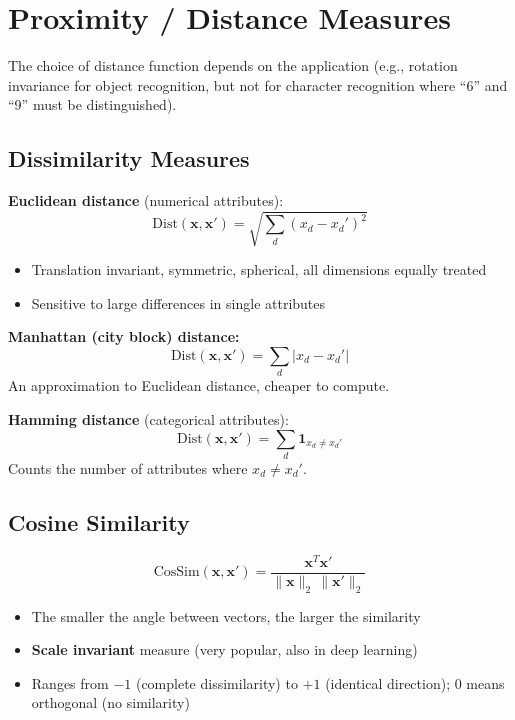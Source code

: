 \documentclass[11pt,a4paper]{article}
\theoremstyle{definition}
\theoremstyle{plain}
\theoremstyle{remark}
\begin{document}

\section{Proximity / Distance Measures}

The choice of distance function depends on the application (e.g., rotation invariance for object recognition, but not for character recognition where ``6'' and ``9'' must be distinguished).

\subsection{Dissimilarity Measures}

\textbf{Euclidean distance} (numerical attributes):
\[
\text{Dist}(\mathbf{x}, \mathbf{x}') = \sqrt{\sum_{d} (x_d - x_d')^2}
\]
\begin{itemize}
    \item Translation invariant, symmetric, spherical, all dimensions equally treated
    \item Sensitive to large differences in single attributes
\end{itemize}

\textbf{Manhattan (city block) distance:}
\[
\text{Dist}(\mathbf{x}, \mathbf{x}') = \sum_{d} |x_d - x_d'|
\]
An approximation to Euclidean distance, cheaper to compute.

\textbf{Hamming distance} (categorical attributes):
\[
\text{Dist}(\mathbf{x}, \mathbf{x}') = \sum_{d} \mathbf{1}_{x_d \neq x_d'}
\]
Counts the number of attributes where $x_d \neq x_d'$.

\subsection{Cosine Similarity}

\[
\text{CosSim}(\mathbf{x}, \mathbf{x}') = \frac{\mathbf{x}^T \mathbf{x}'}{\|\mathbf{x}\|_2 \, \|\mathbf{x}'\|_2}
\]

\begin{itemize}
    \item The smaller the angle between vectors, the larger the similarity
    \item \textbf{Scale invariant} measure (very popular, also in deep learning)
    \item Ranges from $-1$ (complete dissimilarity) to $+1$ (identical direction); $0$ means orthogonal (no similarity)
\end{itemize}
\end{document}
